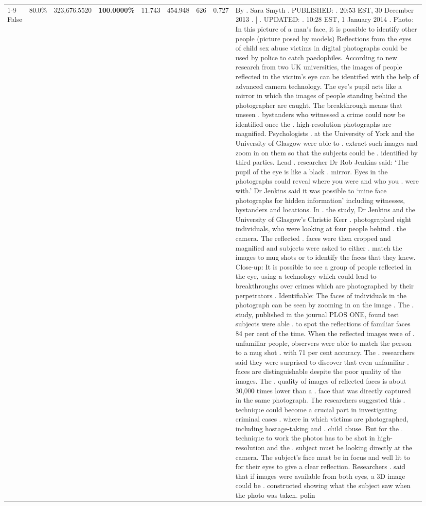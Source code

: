 \begin{table}[H]
\begin{tabular}{lllrlllll}
\cline{1-9}
False & 80.0\% & 323,676.5520 & \bfseries \color{red} 100.0000\% & 11.743 & 454.948 & 626 & 0.727 & By . Sara Smyth . PUBLISHED: . 20:53 EST, 30 December 2013 . | . UPDATED: . 10:28 EST, 1 January 2014 . Photo: In this picture of a man's face, it is possible to identify other people (picture posed by models) Reflections from the eyes of child sex abuse victims in digital photographs could be used by police to catch paedophiles. According to new research from two UK universities, the images of people reflected in the victim's eye can be identified with the help of advanced camera technology. The eye's pupil acts like a mirror in which the images of people standing behind the photographer are caught. The breakthrough means that unseen . bystanders who witnessed a crime could now be identified once the . high-resolution photographs are magnified. Psychologists . at the University of York and the University of Glasgow were able to . extract such images and zoom in on them so that the subjects could be . identified by third parties. Lead . researcher Dr Rob Jenkins said: ‘The pupil of the eye is like a black . mirror. Eyes in the photographs could reveal where you were and who you . were with.' Dr Jenkins said it was possible to ‘mine face photographs for hidden information' including witnesses, bystanders and locations. In . the study, Dr Jenkins and the University of Glasgow's Christie Kerr . photographed eight individuals, who were looking at four people behind . the camera. The reflected . faces were then cropped and magnified and subjects were asked to either . match the images to mug shots or to identify the faces that they knew. Close-up: It is possible to see a group of people reflected in the eye, using a technology which could lead to breakthroughs over crimes which are photographed by their perpetrators . Identifiable: The faces of individuals in the photograph can be seen by zooming in on the image . The . study, published in the journal PLOS ONE, found test subjects were able . to spot the reflections of familiar faces 84 per cent of the time. When the reflected images were of . unfamiliar people, observers were able to match the person to a mug shot . with 71 per cent accuracy. The . researchers said they were surprised to discover that even unfamiliar . faces are distinguishable despite the poor quality of the images. The . quality of images of reflected faces is about 30,000 times lower than a . face that was directly captured in the same photograph. The researchers suggested this . technique could become a crucial part in investigating criminal cases . where in which victims are photographed, including hostage-taking and . child abuse. But for the . technique to work the photos has to be shot in high-resolution and the . subject must be looking directly at the camera. The subject's face must be in focus and well lit to for their eyes to give a clear reflection. Researchers . said that if images were available from both eyes, a 3D image could be . constructed showing what the subject saw when the photo was taken. polin \\

\end{tabular}
\end{table}
